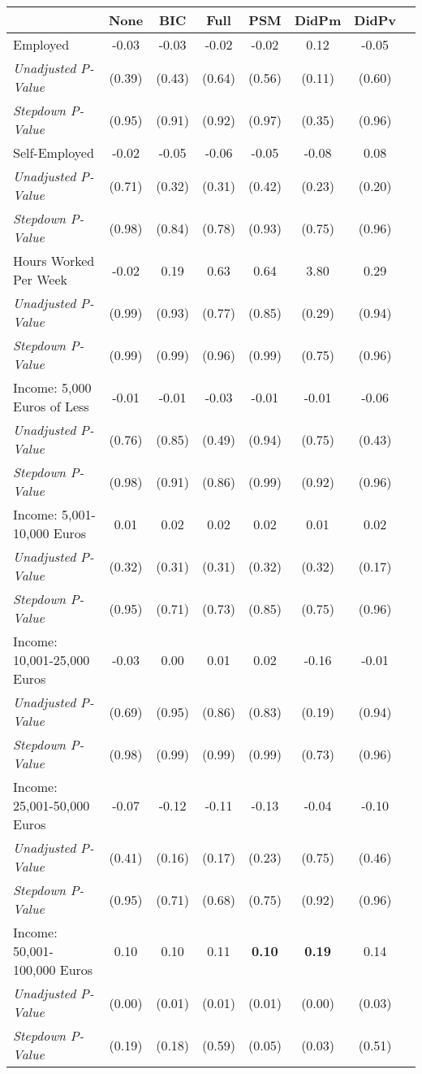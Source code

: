 \begin{tabular}{l c c c c c c c}
\toprule
 & None & BIC & Full & PSM & DidPm & DidPv \\
\midrule
Employed & -0.03 & -0.03 & -0.02 & -0.02 & 0.12 & -0.05 \\
\quad \textit{Unadjusted P-Value} & (0.39) & (0.43) & (0.64) & (0.56) & (0.11) & (0.60) \\
\quad \textit{Stepdown P-Value} & (0.95) & (0.91) & (0.92) & (0.97) & (0.35) & (0.96) \\
Self-Employed & -0.02 & -0.05 & -0.06 & -0.05 & -0.08 & 0.08 \\
\quad \textit{Unadjusted P-Value} & (0.71) & (0.32) & (0.31) & (0.42) & (0.23) & (0.20) \\
\quad \textit{Stepdown P-Value} & (0.98) & (0.84) & (0.78) & (0.93) & (0.75) & (0.96) \\
Hours Worked Per Week & -0.02 & 0.19 & 0.63 & 0.64 & 3.80 & 0.29 \\
\quad \textit{Unadjusted P-Value} & (0.99) & (0.93) & (0.77) & (0.85) & (0.29) & (0.94) \\
\quad \textit{Stepdown P-Value} & (0.99) & (0.99) & (0.96) & (0.99) & (0.75) & (0.96) \\
Income: 5,000 Euros of Less & -0.01 & -0.01 & -0.03 & -0.01 & -0.01 & -0.06 \\
\quad \textit{Unadjusted P-Value} & (0.76) & (0.85) & (0.49) & (0.94) & (0.75) & (0.43) \\
\quad \textit{Stepdown P-Value} & (0.98) & (0.91) & (0.86) & (0.99) & (0.92) & (0.96) \\
Income: 5,001-10,000 Euros & 0.01 & 0.02 & 0.02 & 0.02 & 0.01 & 0.02 \\
\quad \textit{Unadjusted P-Value} & (0.32) & (0.31) & (0.31) & (0.32) & (0.32) & (0.17) \\
\quad \textit{Stepdown P-Value} & (0.95) & (0.71) & (0.73) & (0.85) & (0.75) & (0.96) \\
Income: 10,001-25,000 Euros & -0.03 & 0.00 & 0.01 & 0.02 & -0.16 & -0.01 \\
\quad \textit{Unadjusted P-Value} & (0.69) & (0.95) & (0.86) & (0.83) & (0.19) & (0.94) \\
\quad \textit{Stepdown P-Value} & (0.98) & (0.99) & (0.99) & (0.99) & (0.73) & (0.96) \\
Income: 25,001-50,000 Euros & -0.07 & -0.12 & -0.11 & -0.13 & -0.04 & -0.10 \\
\quad \textit{Unadjusted P-Value} & (0.41) & (0.16) & (0.17) & (0.23) & (0.75) & (0.46) \\
\quad \textit{Stepdown P-Value} & (0.95) & (0.71) & (0.68) & (0.75) & (0.92) & (0.96) \\
Income: 50,001-100,000 Euros & 0.10 & 0.10 & 0.11 & \textbf{ 0.10 } & \textbf{ 0.19 } & 0.14 \\
\quad \textit{Unadjusted P-Value} & (0.00) & (0.01) & (0.01) & (0.01) & (0.00) & (0.03) \\
\quad \textit{Stepdown P-Value} & (0.19) & (0.18) & (0.59) & (0.05) & (0.03) & (0.51) \\
\bottomrule
\end{tabular}
